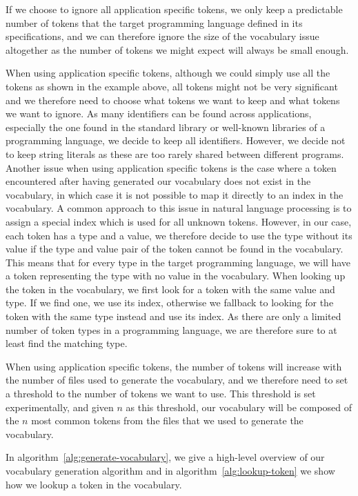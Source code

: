 If we choose to ignore all application specific tokens, we only keep a
predictable number of tokens that the target programming language defined in its
specifications, and we can therefore ignore the size of the vocabulary issue
altogether as the number of tokens we might expect will always be small enough.

When using application specific tokens, although we could simply use all the
tokens as shown in the example above, all tokens might not be very significant
and we therefore need to choose what tokens we want to keep and what tokens we
want to ignore. As many identifiers can be found across applications, especially
the one found in the standard library or well-known libraries of a programming
language, we decide to keep all identifiers. However, we decide not to keep
string literals as these are too rarely shared between different programs.
Another issue when using application specific tokens is the case where a token
encountered after having generated our vocabulary does not exist in the
vocabulary, in which case it is not possible to map it directly to an index in
the vocabulary. A common approach to this issue in natural language processing
is to assign a special index which is used for all unknown tokens. However, in
our case, each token has a type and a value, we therefore decide to use the type
without its value if the type and value pair of the token cannot be found in the
vocabulary. This means that for every type in the target programming language,
we will have a token representing the type with no value in the vocabulary. When
looking up the token in the vocabulary, we first look for a token with the same
value and type. If we find one, we use its index, otherwise we fallback to
looking for the token with the same type instead and use its index. As there are
only a limited number of token types in a programming language, we are therefore
sure to at least find the matching type.

When using application specific tokens, the number of tokens will increase with
the number of files used to generate the vocabulary, and we therefore need to
set a threshold to the number of tokens we want to use. This threshold is set
experimentally, and given $n$ as this threshold, our vocabulary will be composed
of the $n$ most common tokens from the files that we used to generate the
vocabulary.

In algorithm~\ref{alg:generate-vocabulary}, we give a high-level overview of our
vocabulary generation algorithm and in algorithm~\ref{alg:lookup-token} we show
how we lookup a token in the vocabulary.

